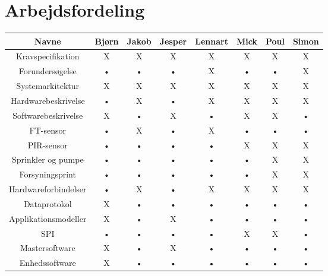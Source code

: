 \chapter*{Arbejdsfordeling}

\begin{tabular}{|c|c|c|c|c|c|c|c|}
\hline 
\textbf{Navne} 		& Bjørn 	& Jakob 	& Jesper 	& Lennart 	& Mick 	& Poul 	& Simon \\ 
\hline 
Kravspecifikation 	& X 		& X 		& X 			& X 			& X 		& X 		& X \\ 
\hline 
Forundersøgelse 		& • 		& • 		& • 			& X 			& • 		& • 		& X \\ 
\hline 
Systemarkitektur 	& X 		& X 		& X 			& X 			& X 		& X 		& X \\ 
\hline 
Hardwarebeskrivelse	& • 		& X 		& • 			& X 			& X 		& X 		& X \\ 
\hline 
Softwarebeskrivelse	& X 		& • 		& X 			& • 			& X 		& X 		& • \\ 
\hline 
FT-sensor			& • 		& X 		& • 			& X 			& • 		& • 		& • \\ 
\hline 
PIR-sensor			& • 		& • 		& • 			& • 			& X 		& X 		& X \\ 
\hline 
Sprinkler og pumpe	& • 		& • 		& • 			& • 			& • 		& X 		& X \\ 
\hline 
Forsyningsprint		& • 		& • 		& • 			& • 			& • 		& X		& X \\ 
\hline 
Hardwareforbindelser	& • 		& X 		& • 			& X 			& X 		& X 		& X \\ 
\hline 
Dataprotokol			& X 		& • 		& • 			& • 			& • 		& • 		& • \\  
\hline 
Applikationsmodeller	& X 		& • 		& X 			& • 			& • 		& • 		& • \\ 
\hline 
SPI				& • 		& • 		& • 			& • 			& X 		& X 		& • \\  
\hline 
Mastersoftware			& X 		& • 		& X 			& • 			& • 		& • 		& • \\  
\hline 
Enhedssoftware			& X 		& • 		& • 			& • 			& • 		& • 		& • \\  
\hline 
\end{tabular} 